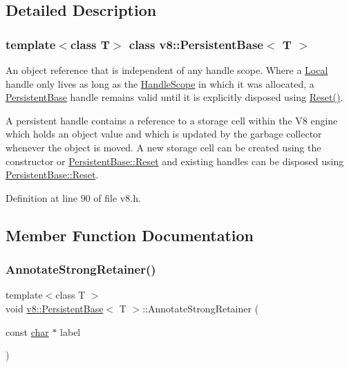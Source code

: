 \subsection{Detailed Description}
\subsubsection*{template$<$class T$>$\newline
class v8\+::\+Persistent\+Base$<$ T $>$}

An object reference that is independent of any handle scope. Where a \mbox{\hyperlink{classv8_1_1Local}{Local}} handle only lives as long as the \mbox{\hyperlink{classv8_1_1HandleScope}{Handle\+Scope}} in which it was allocated, a \mbox{\hyperlink{classv8_1_1PersistentBase}{Persistent\+Base}} handle remains valid until it is explicitly disposed using \mbox{\hyperlink{classv8_1_1PersistentBase_a174bb1e45b18fd4eeaee033622825bb8}{Reset()}}.

A persistent handle contains a reference to a storage cell within the V8 engine which holds an object value and which is updated by the garbage collector whenever the object is moved. A new storage cell can be created using the constructor or \mbox{\hyperlink{classv8_1_1PersistentBase_a174bb1e45b18fd4eeaee033622825bb8}{Persistent\+Base\+::\+Reset}} and existing handles can be disposed using \mbox{\hyperlink{classv8_1_1PersistentBase_a174bb1e45b18fd4eeaee033622825bb8}{Persistent\+Base\+::\+Reset}}. 

Definition at line 90 of file v8.\+h.



\subsection{Member Function Documentation}
\mbox{\label{classv8_1_1PersistentBase_a27ddb6118b13225207e9641c1e6c8c91}} 
\subsubsection{\texorpdfstring{Annotate\+Strong\+Retainer()}{AnnotateStrongRetainer()}}
{\footnotesize\ttfamily template$<$class T $>$ \\
void \mbox{\hyperlink{classv8_1_1PersistentBase}{v8\+::\+Persistent\+Base}}$<$ T $>$\+::Annotate\+Strong\+Retainer (\begin{DoxyParamCaption}\item[{const \mbox{\hyperlink{classchar}{char}} $\ast$}]{label }\end{DoxyParamCaption})}

